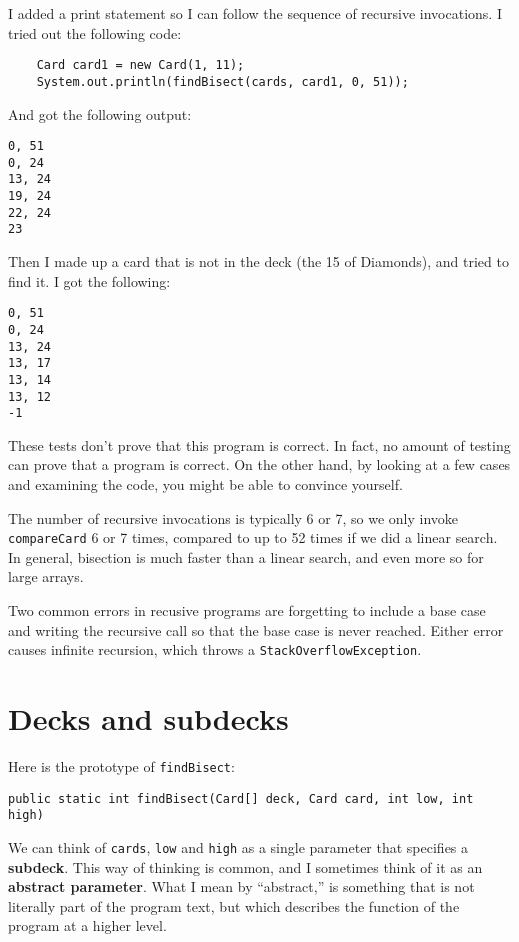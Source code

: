 \documentclass[12pt]{book}
\theoremstyle{definition}
\begin{document}
I added a print statement so I can follow
the sequence of recursive invocations.  I tried out the
following code:

\begin{lstlisting}
    Card card1 = new Card(1, 11);
    System.out.println(findBisect(cards, card1, 0, 51));
\end{lstlisting}
%
And got the following output:

\begin{lstlisting}
0, 51
0, 24
13, 24
19, 24
22, 24
23
\end{lstlisting}
%
Then I made up a card that is not in the deck (the 15 of Diamonds),
and tried to find it.  I got the following:

\begin{lstlisting}
0, 51
0, 24
13, 24
13, 17
13, 14
13, 12
-1
\end{lstlisting}
%
These tests don't prove that this program is correct.  In fact, no
amount of testing can prove that a program is correct.  On the other
hand, by looking at a few cases and examining the code, you might be
able to convince yourself.

The number of recursive invocations is typically 6 or 7,
so we only invoke {\tt compareCard} 6 or 7 times,
compared to up to 52 times if we did a linear search.  In general,
bisection is much faster than a linear search, and even more so for
large arrays.

Two common errors in recusive programs are forgetting to include a
base case and writing the recursive call so that the base case is never
reached.  Either error causes infinite recursion, 
which throws a {\tt StackOverflowException}.


\section{Decks and subdecks}

Here is the prototype of {\tt findBisect}:

\begin{lstlisting}
public static int findBisect(Card[] deck, Card card, int low, int high)
\end{lstlisting}


We can think of {\tt cards},
{\tt low} and {\tt high} as a single parameter that specifies a {\bf
subdeck}.  This way of thinking is common, and I sometimes think
of it as an {\bf abstract parameter}.  What I mean by ``abstract,'' is
something that is not literally part of the program text, but which
describes the function of the program at a higher level.
\end{document}
